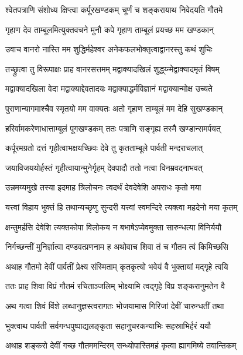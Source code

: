\twolineshloka
{श्वेतपत्राणि संशोध्य क्षिप्त्वा कर्पूरखण्डकम्}
{चूर्णं च शङ्करायाथ निवेदयति गौतमे}%

\twolineshloka
{गृहाण देव ताम्बूलमित्युक्तवचने मुनौ}
{कपे गृहाण ताम्बूलं प्रयच्छ मम खण्डकान्}%

\twolineshloka
{उवाच वानरो नास्ति मम शुद्धिर्महेश्वर}
{अनेकफलभोक्तृत्वाद्वानरस्तु कथं शुचिः}%

\twolineshloka
{तच्छ्रुत्वा तु विरूपाक्षः प्राह वानरसत्तमम्}
{मद्वाक्यादखिलं शुद्ध्य्न्मेद्वाक्यादमृतं विषम्}%

\twolineshloka
{मद्वाक्यादखिला वेदा मद्वाक्याद्देवतादयः}
{मद्वाक्याद्धर्मविज्ञानं मद्वाक्यान्मोक्ष उच्यते}%

\twolineshloka
{पुराणान्यागमाश्चैव स्मृतयो मम वाक्यतः}
{अतो गृहाण ताम्बूलं मम देहि सुखण्डकान्}%

\twolineshloka
{हरिर्वामकरेणाधात्ताम्बूलं पूगखण्डकम्}
{ततः पत्राणि सङ्गृह्य तस्मै खण्डान्समर्पयत्}%

\twolineshloka
{कर्पूरमग्रतो दत्तं गृहीत्वाभक्षयच्छिवः}
{देवे तु कृतताम्बूले पार्वती मन्दराचलात्}%

\twolineshloka
{जयाविजययोर्हस्तं गृहीत्वायान्मुनेर्गृहम्}
{देवपादौ ततो नत्वा विनम्रवदनाभवत्}%

\twolineshloka
{उन्नमय्यमुखे तस्या इदमाह त्रिलोचनः}
{त्वदर्थं देवदेवेशि अपराधः कृतो मया}%

\twolineshloka
{यत्त्वां विहाय भुक्तं हि तथान्यच्छृणु सुन्दरी}
{यत्त्वां स्वमन्दिरे त्यक्त्वा महदेनो मया कृतम्}%

\twolineshloka
{क्षन्तुमर्हसि देवेशि त्यक्तकोपा विलोकय}
{न बभाषेऽप्येवमुक्ता सारुन्धत्या विनिर्ययौ}%

\twolineshloka
{निर्गच्छन्तीं मुनिर्ज्ञात्वा दण्डवत्प्रणनाम ह}
{अथोवाच शिवा तं च गौतम त्वं किमिच्छसि}%

\twolineshloka
{अथाह गौतमो देवीं पार्वतीं प्रेक्ष्य संस्मिताम्}
{कृतकृत्यो भवेयं वै भुक्तायां मद्गृहे त्वयि}%

\twolineshloka
{ततः प्राह शिवा विप्रं गौतमं रचिताञ्जलिम्}
{भोक्ष्यामि त्वद्गृहे विप्र शङ्करानुमतेन वै}%

\twolineshloka
{अथ गत्वा शिवं विंशे लब्धानुज्ञस्त्वरागतः}
{भोजयामास गिरिजां देवीं चारुन्धतीं तथा}%

\twolineshloka
{भुक्त्वाथ पार्वती सर्वगन्धपुष्पाद्यलङ्कृता}
{सहानुचरकन्याभिः सहस्राभिर्हरं ययौ}%

\twolineshloka
{अथाह शङ्करो देवीं गच्छ गौतममन्दिरम्}
{सन्ध्योपास्तिमहं कृत्वा ह्यागमिष्ये तवान्तिकम्}%

